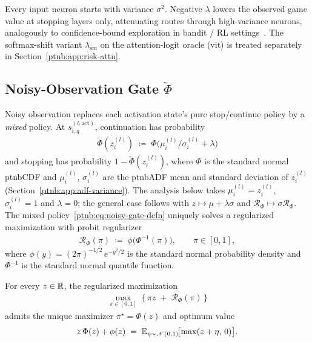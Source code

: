Every input neuron starts with variance $\sigma^2$.
Negative $\lambda$ lowers the observed game value at stopping layers only,
attenuating routes through high-variance neurons, analogously to confidence-bound exploration in bandit / RL
settings~\parencite{auer2002finite,zhang2021risk}. The softmax-shift variant $\lambda_{\mathrm{sm}}$
on the attention-logit oracle (\acs{vit}) is treated separately in Section~\ref{ptnb:app:risk-attn}.

\subsection{Noisy-Observation Gate \texorpdfstring{$\tilde\Phi$}{Phi}}\label{ptnb:app:noisy-gate-mode}

Noisy observation replaces each activation state's pure stop/continue policy by a \emph{mixed}
policy. At $s_{i,q}^{(l, \text{act})}$, continuation has
probability
\begin{align}\label{ptnb:eq:noisy-gate-defn}
    \tilde\Phi(z_i^{(l)}) \;\coloneqq\; \Phi\bigl(\mu_i^{(l)}/\sigma_i^{(l)} + \lambda\bigr)
\end{align}
and stopping has probability $1 - \tilde\Phi(z_i^{(l)})$, where $\Phi$ is the
standard normal \ac{ptnbCDF} and $\mu_i^{(l)}$, $\sigma_i^{(l)}$ are the \ac{ptnbADF} mean and standard
deviation of $z_i^{(l)}$ (Section~\ref{ptnb:app:adf-variance}). The analysis below takes
$\mu_i^{(l)}=z_i^{(l)}$, $\sigma_i^{(l)}=1$ and $\lambda=0$; the general case follows with $z
    \mapsto \mu+\lambda\sigma$ and $\mathcal{R}_\Phi \mapsto \sigma\mathcal{R}_\Phi$. The mixed
policy~\eqref{ptnb:eq:noisy-gate-defn} uniquely solves a regularized maximization with probit regularizer
\begin{align}\label{ptnb:eq:noisy-gate-regulariser}
    \mathcal{R}_\Phi(\pi) \;\coloneqq\; \phi\!\bigl(\Phi^{-1}(\pi)\bigr),
    \qquad \pi \in [0,1],
\end{align}
where $\phi(y) = (2\pi)^{-1/2}\,e^{-y^2/2}$ is the standard normal probability density and
$\Phi^{-1}$ is the standard normal quantile function.

\begin{lemmaenv}\label{ptnb:lem:noisy-gate-dual}
For every $z\in\mathbb{R}$, the regularized maximization
\begin{align}\label{ptnb:eq:noisy-gate-objective}
    \max_{\pi \in [0,1]}\; \bigl\{\,\pi z \;+\; \mathcal{R}_\Phi(\pi)\,\bigr\}
\end{align}
admits the unique maximizer $\pi^\star = \Phi(z)$ and optimum value
\begin{align}\label{ptnb:eq:noisy-gate-optimum}
    z\,\Phi(z) + \phi(z) \;=\; \mathbb{E}_{\eta\sim\mathscr{N}(0,1)}\!\bigl[\max(z+\eta,\,0)\bigr].
\end{align}\end{lemmaenv}

